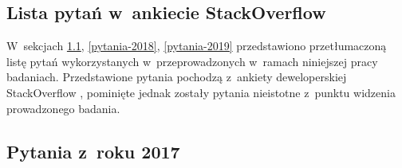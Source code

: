 
\appendix
\begin{appendices}
    \chapter{Lista pytań w~ankiecie StackOverflow}\label{app:dod1}

    W~sekcjach \ref{pytania-2017}, \ref{pytania-2018}, \ref{pytania-2019} przedstawiono przetłumaczoną listę pytań wykorzystanych w~przeprowadzonych w~ramach niniejszej pracy badaniach.
    Przedstawione pytania pochodzą z~ankiety deweloperskiej StackOverflow \cite{so-survey-info}, pominięte jednak zostały pytania nieistotne z~punktu widzenia prowadzonego badania.


    \section{Pytania z~roku 2017}\label{pytania-2017}



\end{appendices}
